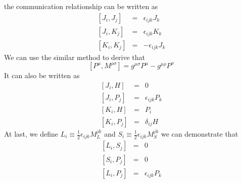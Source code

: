 \documentclass{article}
\begin{document}
the communication relationship can be written as
\begin{eqnarray}
\left[J_i,J_j\right] &=& \epsilon_{ijk}J_k \nonumber \\
\left[J_i,K_j\right] &=& \epsilon_{ijk}K_k \nonumber \\
\left[K_i,K_j\right] &=& -\epsilon_{ijk}J_k \nonumber
\end{eqnarray}
We can use the similar method to derive that
\[[P^{\mu},M^{\rho \sigma}] = g^{\mu \sigma}P^{\mu} - g^{\mu \rho}P^{\sigma}\]
It can also be written as
\begin{eqnarray}
\left[J_i,H\right] &=& 0 \nonumber \\
\left[J_i,P_j\right] &=& \epsilon_{ijk}P_k \nonumber \\
\left[K_i,H\right] &=& P_i \nonumber \\
\left[K_i,P_j\right] &=& \delta_{ij}H \nonumber
\end{eqnarray}
At last, we define $L_i \equiv \frac{1}{2} \epsilon_{ijk} M_L^{jk}$ and $S_i \equiv \frac{1}{2} \epsilon_{ijk} M_S^{jk}$
we can demonstrate that
\begin{eqnarray}
\left[L_i,S_j\right] &=& 0 \nonumber \\
\left[S_i,P_j\right] &=& 0 \nonumber \\
\left[L_i,P_j\right] &=& \epsilon_{ijk}P_k \nonumber
\end{eqnarray}
\end{document}

